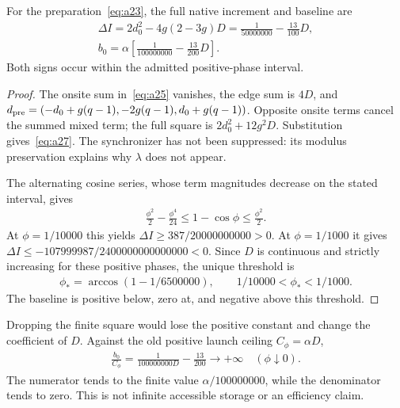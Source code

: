 \begin{proposition}\label{prop:firstjump}
For the preparation~\eqref{eq:a23}, the full native increment and baseline are
\begin{equation}\label{eq:a27}%
\begin{gathered}
\Delta I=2d_0^2-4g(2-3g)D
=\frac1{50000000}-\frac{13}{100}D,\\ b_0=\alpha\left[\frac1{100000000}-\frac{13}{200}D\right].
\end{gathered}
\end{equation}
Both signs occur within the admitted positive-phase interval.
\end{proposition}
\begin{proof}
The onsite sum in~\eqref{eq:a25} vanishes, the edge sum is $4D$, and
$d_{\rm pre}=(-d_0+g(q-1),-2g(q-1),d_0+g(q-1))$.
Opposite onsite terms cancel the summed mixed term; the full square is
$2d_0^2+12g^2D$. Substitution gives~\eqref{eq:a27}. The synchronizer has not been suppressed: its modulus preservation explains why $\lambda$ does not appear.

The alternating cosine series, whose term magnitudes decrease on the stated interval, gives
\begin{equation}\label{eq:a28}%
\begin{gathered}
\frac{\phi^2}{2}-\frac{\phi^4}{24}\le1-\cos\phi\le\frac{\phi^2}{2}.
\end{gathered}
\end{equation}
At $\phi=1/10000$ this yields $\Delta I\ge387/20000000000>0$.
At $\phi=1/1000$ it gives $\Delta I\le-107999987/2400000000000000<0$.
Since $D$ is continuous and strictly increasing for these positive phases, the unique threshold is
\begin{equation}\label{eq:a29}%
\begin{gathered}
\phi_*=\arccos(1-1/6500000),\qquad 1/10000<\phi_*<1/1000.
\end{gathered}
\end{equation}
The baseline is positive below, zero at, and negative above this threshold.
\end{proof}
Dropping the finite square would lose the positive constant and change the coefficient of $D$. Against the old positive launch ceiling $C_\phi=\alpha D$,
\begin{equation}\label{eq:a30}%
\begin{gathered}
\frac{b_0}{C_\phi}=\frac1{100000000D}-\frac{13}{200}\longrightarrow+\infty
\quad(\phi\downarrow0).
\end{gathered}
\end{equation}
The numerator tends to the finite value $\alpha/100000000$, while the denominator tends to zero. This is not infinite accessible storage or an efficiency claim.

